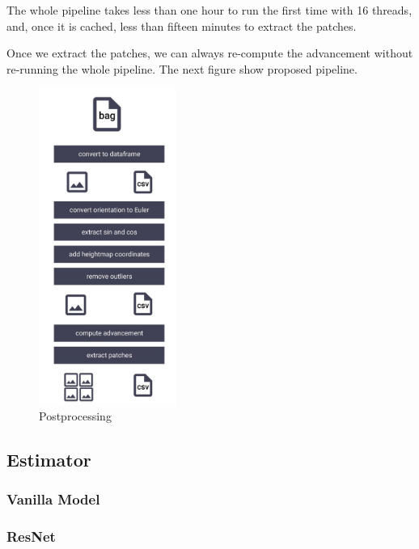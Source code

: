 \documentclass[../document.tex]{subfiles}
\begin{document}
The whole pipeline takes less than one hour to run the first time with 16 threads, and, once it is cached, less than fifteen minutes to extract the patches. 

Once we extract the patches, we can always re-compute the advancement without re-running the whole pipeline. The next figure show proposed pipeline.
\begin{figure}[H] 
\centering
\includegraphics[width=0.4\textwidth]{../img/postprocessing-pipeline.jpg}
\caption{Postprocessing}
\label{fig: postprocessing-pipeline}
\end{figure}
\subsection{Estimator}

\subsubsection{Vanilla Model}
\subsubsection{ResNet}
\end{document}
